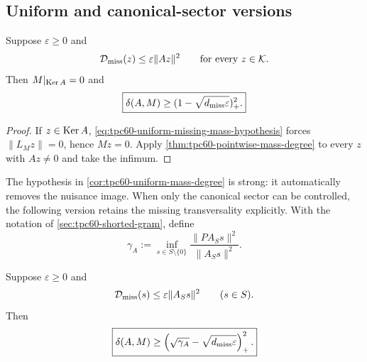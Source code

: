 \subsection{Uniform and canonical-sector versions}

\begin{corollary}
\label{cor:tpc60-uniform-mass-degree}
Suppose \(\varepsilon\ge0\) and
\begin{equation}
 \mathcal D_{\rm miss}(z)\le\varepsilon\|Az\|^2
 \qquad\text{for every }z\in\mathcal K.
 \label{eq:tpc60-uniform-missing-mass-hypothesis}
\end{equation}
Then \(M|_{\operatorname{Ker} A}=0\) and
\begin{equation}
 \boxed{
 \delta(A,M)
 \ge(1-\sqrt{d_{\rm miss}\varepsilon})_+^2.}
 \label{eq:tpc60-uniform-mass-degree-bound}
\end{equation}
\end{corollary}

\begin{proof}
If \(z\in\operatorname{Ker} A\), \eqref{eq:tpc60-uniform-missing-mass-hypothesis}
forces \(\|L_Mz\|=0\), hence \(Mz=0\).  Apply
\cref{thm:tpc60-pointwise-mass-degree} to every \(z\) with \(Az\ne0\) and
take the infimum.
\end{proof}

The hypothesis in \cref{cor:tpc60-uniform-mass-degree} is strong: it
automatically removes the nuisance image.  When only the canonical sector
can be controlled, the following version retains the missing
transversality explicitly.  With the notation of
\cref{sec:tpc60-shorted-gram}, define
\begin{equation}
 \gamma_A
 :=\inf_{s\in S\setminus\{0\}}
   \frac{\|PA_Ss\|^2}{\|A_Ss\|^2}.
 \label{eq:tpc60-gamma-A}
\end{equation}

\begin{proposition}
\label{prop:tpc60-canonical-mass-transversality}
Suppose \(\varepsilon\ge0\) and
\begin{equation}
 \mathcal D_{\rm miss}(s)
 \le\varepsilon\|A_Ss\|^2
 \qquad(s\in S).
 \label{eq:tpc60-canonical-missing-bound}
\end{equation}
Then
\begin{equation}
 \boxed{
 \delta(A,M)
 \ge
 \left(
  \sqrt{\gamma_A}-\sqrt{d_{\rm miss}\varepsilon}
 \right)_+^2.}
 \label{eq:tpc60-canonical-transversality-bound}
\end{equation}
\end{proposition}

